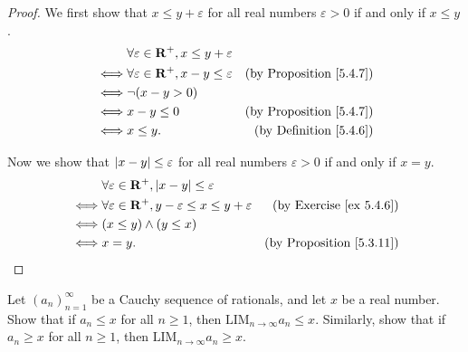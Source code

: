 \begin{proof}
    We first show that \(x \leq y + \varepsilon\) for all real numbers \(\varepsilon > 0\) if and only if \(x \leq y\).
    \begin{align*}
             & \forall \varepsilon \in \mathbf{R}^+, x \leq y + \varepsilon                                       \\
        \iff & \forall \varepsilon \in \mathbf{R}^+, x - y \leq \varepsilon & \text{(by Proposition \ref{5.4.7})} \\
        \iff & \lnot (x - y > 0)                                                                                  \\
        \iff & x - y \leq 0                                                 & \text{(by Proposition \ref{5.4.7})} \\
        \iff & x \leq y.                                                    & \text{(by Definition \ref{5.4.6})}
    \end{align*}

    Now we show that \(\abs*{x - y} \leq \varepsilon\) for all real numbers \(\varepsilon > 0\) if and only if \(x = y\).
    \begin{align*}
             & \forall \varepsilon \in \mathbf{R}^+, \abs*{x - y} \leq \varepsilon                                                      \\
        \iff & \forall \varepsilon \in \mathbf{R}^+, y - \varepsilon \leq x \leq y + \varepsilon & \text{(by Exercise \ref{ex 5.4.6})}  \\
        \iff & (x \leq y) \land (y \leq x)                                                                                              \\
        \iff & x = y.                                                                            & \text{(by Proposition \ref{5.3.11})}
    \end{align*}
\end{proof}

\begin{exercise}\label{ex 5.4.8}
    Let \((a_n)_{n = 1}^{\infty}\) be a Cauchy sequence of rationals, and let \(x\) be a real number.
    Show that if \(a_n \leq x\) for all \(n \geq 1\), then \(\text{LIM}_{n \to \infty} a_n \leq x\).
    Similarly, show that if \(a_n \geq x\) for all \(n \geq 1\), then \(\text{LIM}_{n \to \infty} a_n \geq x\).
\end{exercise}

